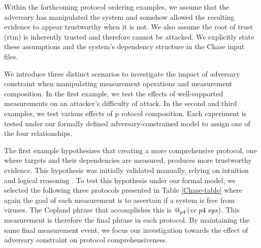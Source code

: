 \documentclass[runningheads]{llncs}
\theoremstyle{definition}
\begin{document}
%     

Within the forthcoming protocol ordering examples, we assume that the adversary has manipulated the system and somehow allowed the resulting evidence to appear trustworthy when it is not. We also assume the root of trust (rtm) is inherently trusted and therefore cannot be attacked. We explicitly state these assumptions and the system's dependency structure in the Chase input files.

We introduce three distinct scenarios to investigate the impact of adversary constraint when manipulating measurement operations and measurement composition. In the first example, we test the effects of well-supported measurements on an attacker's difficulty of attack. In the second and third examples, we test various effects of p rotocol composition. Each experiment is tested under our formally defined adversary-constrained model to assign one of the four relationships.

The first example hypothesizes that creating a more comprehensive protocol, one where targets and their dependencies are measured, produces more trustworthy evidence. This hypothesis was initially validated manually, relying on intuition and logical reasoning \cite{Rowe:2016:Confining}. To test this hypothesis under our formal model, we selected the following three protocols presented in Table \ref{Chase-table} where again the goal of each measurement is to ascertain if a system is free from viruses. The Copland phrase that accomplishes this is $\mathop{@_{p4}}{(vc\; p4\; sys)}$. This measurement is therefore the final phrase in each protocol. By maintaining the same final measurement event, we focus our investigation towards the effect of adversary constraint on protocol comprehensiveness.
\end{document}
